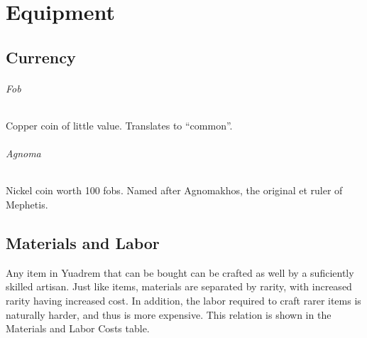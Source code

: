 \chapter{Equipment} \label{ch::equipment}
\section{Currency} \label{sec::currency}
\subparagraph{Fob}
    Copper coin of little value.
    Translates to ``common''.
\subparagraph{Agnoma}
    Nickel coin worth 100 fobs.
    Named after Agnomakhos, the original et ruler of Mephetis.











\section{Materials and Labor} \label{sec::materialsandlabor}
    Any item in Yuadrem that can be bought can be crafted as well by a suficiently skilled artisan.
    Just like items, materials are separated by rarity, with increased rarity having increased cost.
    In addition, the labor required to craft rarer items is naturally harder, and thus is more expensive.
    This relation is shown in the Materials and Labor Costs table.


